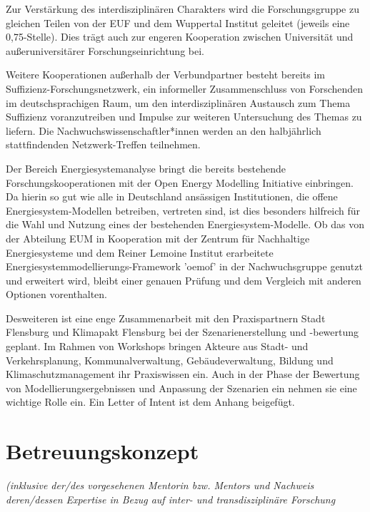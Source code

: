 \documentclass[a4paper,11pt,twoside]{scrartcl}
\begin{document}
Zur Verstärkung des interdisziplinären Charakters wird die Forschungsgruppe zu gleichen Teilen von der EUF und dem Wuppertal Institut geleitet (jeweils eine 0,75-Stelle). Dies trägt auch zur engeren Kooperation zwischen Universität und außeruniversitärer Forschungseinrichtung bei.

Weitere Kooperationen außerhalb der Verbundpartner besteht bereits im Suffizienz-Forschungsnetzwerk, ein informeller Zusammenschluss von Forschenden im deutschsprachigen Raum, um den interdisziplinären Austausch zum Thema Suffizienz voranzutreiben und Impulse zur weiteren Untersuchung des Themas zu liefern. Die Nachwuchswissenschaftler*innen werden an den halbjährlich stattfindenden Netzwerk-Treffen teilnehmen.

Der Bereich Energiesystemanalyse bringt die bereits bestehende Forschungskooperationen mit der Open Energy Modelling Initiative \cite{}
einbringen. Da hierin so gut wie alle in Deutschland ansässigen Institutionen, die offene Energiesystem-Modellen betreiben, vertreten sind, ist dies besonders hilfreich für die Wahl und Nutzung eines der bestehenden Energiesystem-Modelle. Ob das von der Abteilung EUM in Kooperation mit der Zentrum für Nachhaltige Energiesysteme und dem Reiner Lemoine Institut erarbeitete Energiesystemmodellierungs-Framework 'oemof' in der Nachwuchsgruppe genutzt und erweitert wird, bleibt einer genauen Prüfung und dem Vergleich mit anderen Optionen vorenthalten. 




Desweiteren ist eine enge Zusammenarbeit mit den Praxispartnern Stadt Flensburg und Klimapakt Flensburg bei der Szenarienerstellung und -bewertung geplant. Im Rahmen von Workshops bringen Akteure aus Stadt- und Verkehrsplanung, Kommunalverwaltung, Gebäudeverwaltung, Bildung und Klimaschutzmanagement ihr Praxiswissen ein. Auch in der Phase der Bewertung von Modellierungsergebnissen und Anpassung der Szenarien ein nehmen sie eine wichtige Rolle ein. Ein Letter of Intent ist dem Anhang beigefügt.


\section{Betreuungskonzept}
\textit{(inklusive der/des vorgesehenen Mentorin bzw. Mentors und Nachweis deren/dessen Expertise in Bezug auf inter- und transdisziplinäre Forschung}
\end{document}
